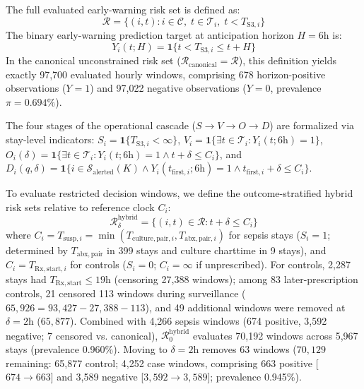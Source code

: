 \documentclass[12pt,a4paper]{article}
\begin{document}
The full evaluated early-warning risk set is defined as:
\begin{equation}
\mathcal{R} = \bigl\{ (i, t) : i \in \mathcal{C}, \; t \in \mathcal{T}_i, \; t < T_{\text{S3}, i} \bigr\}
\end{equation}
The binary early-warning prediction target at anticipation horizon $H = 6\text{h}$ is:
\begin{equation}
Y_i(t; H) = \mathbf{1} \bigl\{ t < T_{\text{S3}, i} \le t + H \bigr\}
\end{equation}
In the canonical unconstrained risk set ($\mathcal{R}_{\text{canonical}} = \mathcal{R}$), this definition yields exactly 97,700 evaluated hourly windows, comprising 678 horizon-positive observations ($Y=1$) and 97,022 negative observations ($Y=0$, prevalence $\pi = 0.694\%$).

The four stages of the operational cascade ($S \to V \to O \to D$) are formalized via stay-level indicators: $S_i = \mathbf{1} \{ T_{\text{S3}, i} < \infty \}$, $V_i = \mathbf{1} \{ \exists t \in \mathcal{T}_i : Y_i(t; 6\text{h}) = 1 \}$, $O_i(\delta) = \mathbf{1} \{ \exists t \in \mathcal{T}_i : Y_i(t; 6\text{h}) = 1 \land t + \delta \le C_i \}$, and $D_i(q, \delta) = \mathbf{1} \{ i \in \mathcal{S}_{\text{alerted}}(K) \land Y_i(t_{\mathrm{first}, i}; 6\text{h}) = 1 \land t_{\mathrm{first}, i} + \delta \le C_i \}$.

To evaluate restricted decision windows, we define the outcome-stratified hybrid risk sets relative to reference clock $C_i$:
\begin{equation}
\mathcal{R}_\delta^{\mathrm{hybrid}} = \bigl\{ (i, t) \in \mathcal{R} : t + \delta \le C_i \bigr\}
\end{equation}
where $C_i = T_{\mathrm{susp}, i} = \min(T_{\mathrm{culture,pair}, i}, T_{\mathrm{abx,pair}, i})$ for sepsis stays ($S_i=1$; determined by $T_{\mathrm{abx,pair}}$ in 399 stays and culture charttime in 9 stays), and $C_i = T_{\mathrm{Rx,start}, i}$ for controls ($S_i=0$; $C_i = \infty$ if unprescribed). For controls, 2,287 stays had $T_{\mathrm{Rx,start}} \le 19\text{h}$ (censoring 27,388 windows); among 83 later-prescription controls, 21 censored 113 windows during surveillance ($65,926 = 93,427 - 27,388 - 113$), and 49 additional windows were removed at $\delta=2\text{h}$ ($65,877$). Combined with 4,266 sepsis windows (674 positive, 3,592 negative; 7 censored vs. canonical), $\mathcal{R}_0^{\mathrm{hybrid}}$ evaluates 70,192 windows across 5,967 stays (prevalence 0.960\%). Moving to $\delta=2\text{h}$ removes 63 windows ($70,129$ remaining: 65,877 control; 4,252 case windows, comprising 663 positive [$674 \to 663$] and 3,589 negative [$3,592 \to 3,589$]; prevalence 0.945\%).
\end{document}
